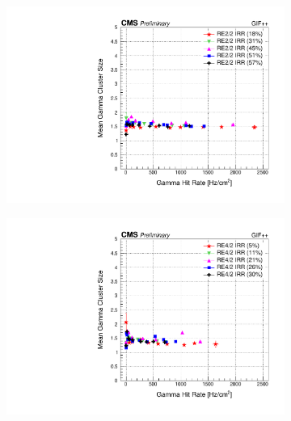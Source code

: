 	\begin{figure}[H]
    	\begin{subfigure}{0.5\linewidth}
			\centering
    		\includegraphics[width = \linewidth]{fig/chapt5/RE2-2_IRR_Cluster_vs_Rate.pdf}
        	\caption{\label{fig:GIFpp_gcls_vs_rate:A}}
    	\end{subfigure}
    	\begin{subfigure}{0.5\linewidth}
			\centering
    		\includegraphics[width = \linewidth]{fig/chapt5/RE4-2_IRR_Cluster_vs_Rate.pdf}
        	\caption{\label{fig:GIFpp_gcls_vs_rate:B}}
    	\end{subfigure}
    	\begin{subfigure}{0.5\linewidth}
			\centering

\end{subfigure}
\end{figure}
